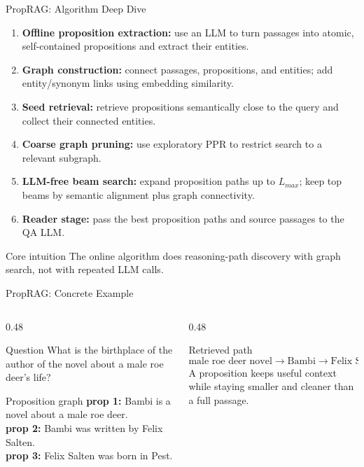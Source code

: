 
\begin{frame}{PropRAG: Algorithm Deep Dive}
\scriptsize
\begin{enumerate}
  \item \textbf{Offline proposition extraction:} use an LLM to turn passages into atomic, self-contained propositions and extract their entities.
  \item \textbf{Graph construction:} connect passages, propositions, and entities; add entity/synonym links using embedding similarity.
  \item \textbf{Seed retrieval:} retrieve propositions semantically close to the query and collect their connected entities.
  \item \textbf{Coarse graph pruning:} use exploratory PPR to restrict search to a relevant subgraph.
  \item \textbf{LLM-free beam search:} expand proposition paths up to $L_{max}$; keep top beams by semantic alignment plus graph connectivity.
  \item \textbf{Reader stage:} pass the best proposition paths and source passages to the QA LLM.
\end{enumerate}
\begin{block}{Core intuition}
The online algorithm does reasoning-path discovery with graph search, not with repeated LLM calls.
\end{block}
\end{frame}

\begin{frame}{PropRAG: Concrete Example}
\scriptsize
\begin{columns}[T,onlytextwidth]
  \begin{column}{0.48\textwidth}
    \begin{block}{Question}
      What is the birthplace of the author of the novel about a male roe deer's life?
    \end{block}
    \begin{block}{Proposition graph}
      \textbf{prop 1:} Bambi is a novel about a male roe deer.\\
      \textbf{prop 2:} Bambi was written by Felix Salten.\\
      \textbf{prop 3:} Felix Salten was born in Pest.
    \end{block}
  \end{column}
  \begin{column}{0.48\textwidth}
    \begin{block}{Retrieved path}
      \[
      \text{male roe deer novel} \rightarrow \text{Bambi} \rightarrow \text{Felix Salten} \rightarrow \text{birthplace}
      \]
      A proposition keeps useful context while staying smaller and cleaner than a full passage.
    \end{block}
  \end{column}
\end{columns}
\end{frame}

